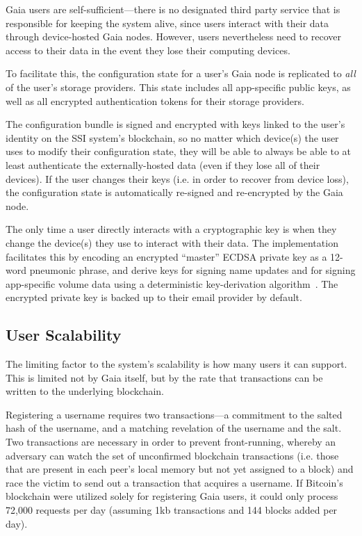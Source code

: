 Gaia users are self-sufficient---there is no designated third party service that is
responsible for keeping the system alive, since users interact with their data
through device-hosted Gaia nodes.  However, users nevertheless need to recover
access to their data in the event they lose their computing devices.

To facilitate this, the configuration state for a user's Gaia node is replicated to \textit{all} of
the user's storage providers.  This state includes all app-specific public keys,
as well as all encrypted authentication tokens for their storage providers.

The configuration bundle is signed and encrypted with keys linked to
the user's identity on the SSI system's blockchain, so no matter which device(s) the user
uses to modify their configuration state, they will be able to always be able to
at least authenticate the externally-hosted data (even if they lose all of their
devices).  If the user changes their keys (i.e. in order to recover from device
loss), the configuration state is
automatically re-signed and re-encrypted by the Gaia node.

The only time a user directly interacts with a cryptographic key is when they
change the device(s) they use to interact with their data.
The implementation facilitates this by
encoding an encrypted ``master'' ECDSA private key as a 12-word pneumonic phrase, and derive keys
for signing name updates and for signing app-specific volume data
using a deterministic key-derivation
algorithm~\cite{bip39}.  The encrypted private key is backed up to their email provider by
default.

\subsection{User Scalability}

The limiting factor to the system's scalability is how many users it can support.
This is limited not by Gaia itself, but by the rate that transactions can be
written to the underlying blockchain.

Registering a username requires two
transactions---a commitment to the salted hash of the username, and a matching
revelation of the username and the salt.  Two transactions are necessary in
order to prevent front-running, whereby an adversary can watch the set of
unconfirmed blockchain transactions (i.e. those that are present in each peer's
local memory but not yet assigned to a block) and race the victim to send out
a transaction that acquires a username.  If Bitcoin's blockchain were utilized
solely for registering Gaia users, it could only process 72,000 requests per day
(assuming 1kb transactions and 144 blocks added per day).

